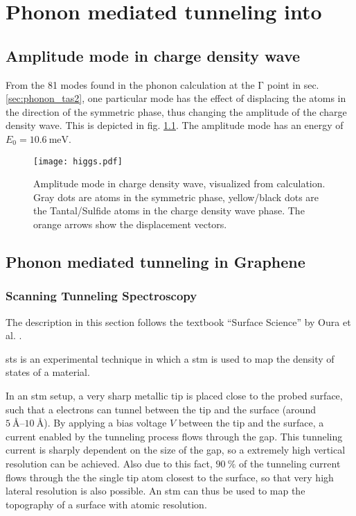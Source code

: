 \documentclass[main.tex]{subfiles}
\begin{document}
\chapter{Phonon mediated tunneling into \TaS}\label{ch:sts_gap_tas2}

\section{Amplitude mode in \TaS charge density wave}\label{sec:amplitude_mode_tas2}

From the 81 modes found in the phonon calculation at the \(\mathrm{\Gamma}\) point in sec. \ref{sec:phonon_tas2}, one particular mode has the effect of displacing the atoms in the direction of the symmetric phase, thus changing the amplitude of the charge density wave.
This is depicted in fig. \ref{fig:amplitude_mode_tas2}.
The amplitude mode has an energy of \(E_0 = \SI{10.6}{\milli\eV}\).

\begin{figure}[h!]
    \centering
    \texttt{[image: higgs.pdf]}
    \caption{Amplitude mode in \TaS charge density wave, visualized from \QE calculation. Gray dots are atoms in the symmetric phase, yellow/black dots are the Tantal/Sulfide atoms in the charge density wave phase. The orange arrows show the displacement vectors.}
    \label{fig:amplitude_mode_tas2}
\end{figure}

\section{Phonon mediated tunneling in Graphene}

\subsection{Scanning Tunneling Spectroscopy}\label{sub:sts}

The description in this section follows the textbook \enquote{Surface Science} by Oura et al. \cite{oura_surface_2003}.

\acrfull{sts} is an experimental technique in which a \acrfull{stm} is used to map the density of states of a material.

In an \acrshort{stm} setup, a very sharp metallic tip is placed close to the probed surface, such that a electrons can tunnel between the tip and the surface (around \(\SIrange{5}{10}{\angstrom}\)).
By applying a bias voltage \(V\) between the tip and the surface, a current enabled by the tunneling process flows through the gap.
This tunneling current is sharply dependent on the size of the gap, so a extremely high vertical resolution can be achieved.
Also due to this fact, \(\SI{90}{\percent}\) of the tunneling current flows through the the single tip atom closest to the surface, so that very high lateral resolution is also possible.
An \acrshort{stm} can thus be used to map the topography of a surface with atomic resolution.
\end{document}
